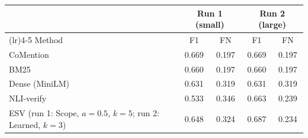 \setlength{\tabcolsep}{3pt}
\begin{tabular}{>{\raggedright\arraybackslash}p{4.1cm}cccc}
\toprule
 & \multicolumn{2}{c}{Run 1 (small)} & \multicolumn{2}{c}{Run 2 (large)} \\
\cmidrule(lr){2-3}\cmidrule(lr){4-5}
Method & F1 & FN & F1 & FN \\
\midrule
CoMention & 0.669 & 0.197 & 0.669 & 0.197 \\
BM25 & 0.660 & 0.197 & 0.660 & 0.197 \\
Dense (MiniLM) & 0.631 & 0.319 & 0.631 & 0.319 \\
NLI-verify & 0.533 & 0.346 & 0.663 & 0.239 \\
ESV (run 1: Scope, $a=0.5$, $k=5$; run 2: Learned, $k=3$) & 0.648 & 0.324 & 0.687 & 0.234 \\
\bottomrule
\end{tabular}
